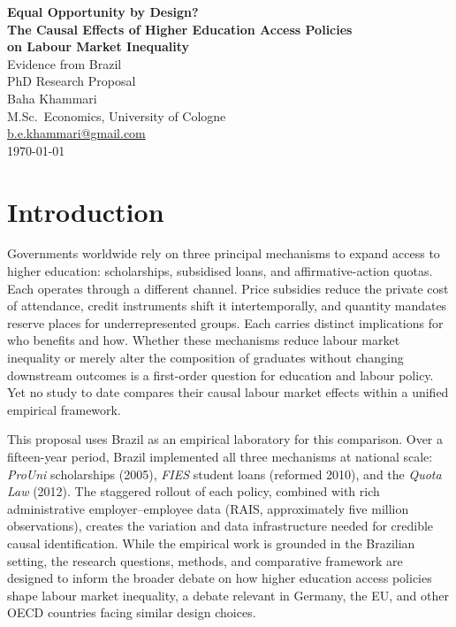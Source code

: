 \documentclass[a4paper,11pt]{article}
\begin{document}
\begin{center}
\vspace*{1cm}
{\LARGE \textbf{Equal Opportunity by Design?}} \\[8pt]
{\Large \textbf{The Causal Effects of Higher Education Access Policies}} \\[4pt]
{\Large \textbf{on Labour Market Inequality}} \\[8pt]
{\large Evidence from Brazil} \\[24pt]
{\large PhD Research Proposal} \\[16pt]
{\large Baha Khammari} \\[4pt]
M.Sc.\ Economics, University of Cologne \\
\href{mailto:b.e.khammari@gmail.com}{b.e.khammari@gmail.com} \\[4pt]
\today
\end{center}

\vspace{24pt}

\section{Introduction}

Governments worldwide rely on three principal mechanisms to expand access to higher education: scholarships, subsidised loans, and affirmative-action quotas. Each operates through a different channel. Price subsidies reduce the private cost of attendance, credit instruments shift it intertemporally, and quantity mandates reserve places for underrepresented groups. Each carries distinct implications for who benefits and how. Whether these mechanisms reduce labour market inequality or merely alter the composition of graduates without changing downstream outcomes is a first-order question for education and labour policy. Yet no study to date compares their causal labour market effects within a unified empirical framework.

This proposal uses Brazil as an empirical laboratory for this comparison. Over a fifteen-year period, Brazil implemented all three mechanisms at national scale: \textit{ProUni} scholarships (2005), \textit{FIES} student loans (reformed 2010), and the \textit{Quota Law} (2012). The staggered rollout of each policy, combined with rich administrative employer--employee data (RAIS, approximately five million observations), creates the variation and data infrastructure needed for credible causal identification. While the empirical work is grounded in the Brazilian setting, the research questions, methods, and comparative framework are designed to inform the broader debate on how higher education access policies shape labour market inequality, a debate relevant in Germany, the EU, and other OECD countries facing similar design choices.
\end{document}

